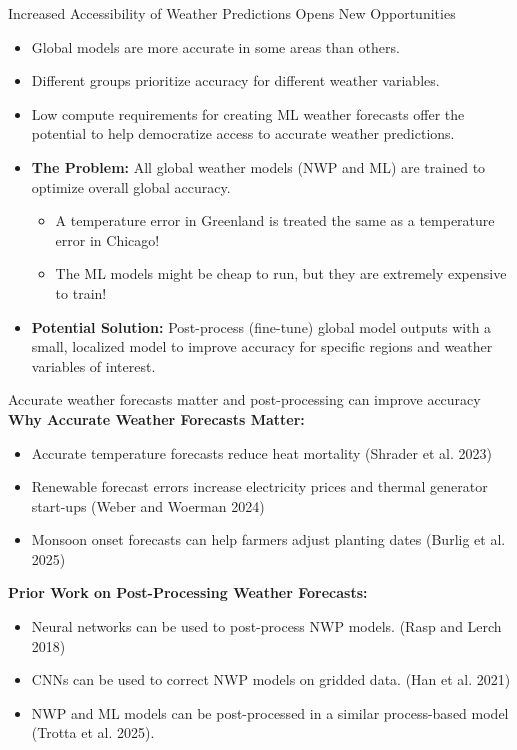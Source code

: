 \documentclass[aspectratio=169, xcolor=dvipsnames]{beamer}
\begin{document}
\begin{frame}{Increased Accessibility of Weather Predictions Opens New Opportunities}
    \begin{itemize}
        \item Global models are more accurate in some areas than others.
        \item Different groups prioritize accuracy for different weather variables.
        \item Low compute requirements for creating ML weather forecasts offer the potential to help democratize access to accurate weather predictions.
    \end{itemize}
        
    \pause
    \begin{itemize}
        \item \textbf{The Problem:} All global weather models (NWP and ML) are trained to optimize overall global accuracy.
        \begin{itemize}
            \item A temperature error in Greenland is treated the same as a temperature error in Chicago!
            \item The ML models might be cheap to run, but they are extremely expensive to train!
        \end{itemize}
     \item \textbf{Potential Solution:} Post-process (fine-tune) global model outputs with a small, localized model to improve accuracy for specific regions and weather variables of interest. 
    \end{itemize}
\end{frame}

\begin{frame}{Accurate weather forecasts matter and post-processing can improve accuracy}
    \textbf{Why Accurate Weather Forecasts Matter:}
    \begin{itemize}
        \item Accurate temperature forecasts reduce heat mortality (Shrader et al. 2023)
        \item Renewable forecast errors increase electricity prices and thermal generator start-ups (Weber and Woerman 2024)
        \item Monsoon onset forecasts can help farmers adjust planting dates (Burlig et al. 2025)
    \end{itemize}

    \textbf{Prior Work on Post-Processing Weather Forecasts:}
    \begin{itemize}
        \item Neural networks can be used to post-process NWP models. (Rasp and Lerch 2018)
        \item CNNs can be used to correct NWP models on gridded data. (Han et al. 2021) 
        \item NWP and ML models can be post-processed in a similar process-based model (Trotta et al. 2025). 
    \end{itemize}
\end{frame}
\end{document}
